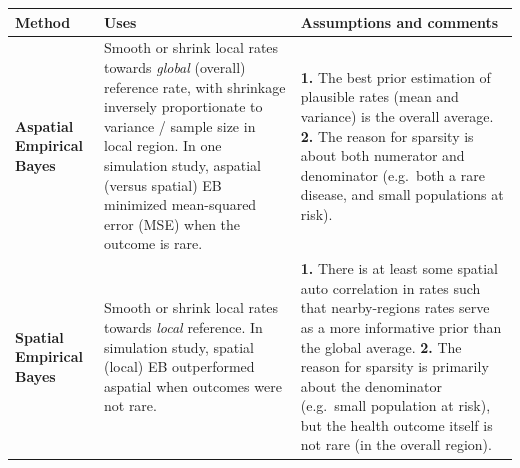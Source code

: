 \documentclass[
]{book}
\begin{document}
\begin{longtable}[]{@{}lll@{}}
\toprule
\begin{minipage}[b]{0.19\columnwidth}\raggedright
Method\strut
\end{minipage} & \begin{minipage}[b]{0.32\columnwidth}\raggedright
Uses\strut
\end{minipage} & \begin{minipage}[b]{0.40\columnwidth}\raggedright
Assumptions and comments\strut
\end{minipage}\tabularnewline
\midrule
\endhead
\begin{minipage}[t]{0.19\columnwidth}\raggedright
\textbf{Aspatial Empirical Bayes}\strut
\end{minipage} & \begin{minipage}[t]{0.32\columnwidth}\raggedright
Smooth or shrink local rates towards \emph{global} (overall) reference rate, with shrinkage inversely proportionate to variance / sample size in local region. In one simulation study, aspatial (versus spatial) EB minimized mean-squared error (MSE) when the outcome is rare.\strut
\end{minipage} & \begin{minipage}[t]{0.40\columnwidth}\raggedright
\textbf{1.} The best prior estimation of plausible rates (mean and variance) is the overall average. \textbf{2.} The reason for sparsity is about both numerator and denominator (e.g.~both a rare disease, and small populations at risk).\strut
\end{minipage}\tabularnewline
\begin{minipage}[t]{0.19\columnwidth}\raggedright
\textbf{Spatial Empirical Bayes}\strut
\end{minipage} & \begin{minipage}[t]{0.32\columnwidth}\raggedright
Smooth or shrink local rates towards \emph{local} reference. In simulation study, spatial (local) EB outperformed aspatial when outcomes were not rare.\strut
\end{minipage} & \begin{minipage}[t]{0.40\columnwidth}\raggedright
\textbf{1.} There is at least some spatial auto correlation in rates such that nearby-regions rates serve as a more informative prior than the global average. \textbf{2.} The reason for sparsity is primarily about the denominator (e.g.~small population at risk), but the health outcome itself is not rare (in the overall region).\strut
\end{minipage}\tabularnewline
\bottomrule
\end{longtable}
\end{document}
